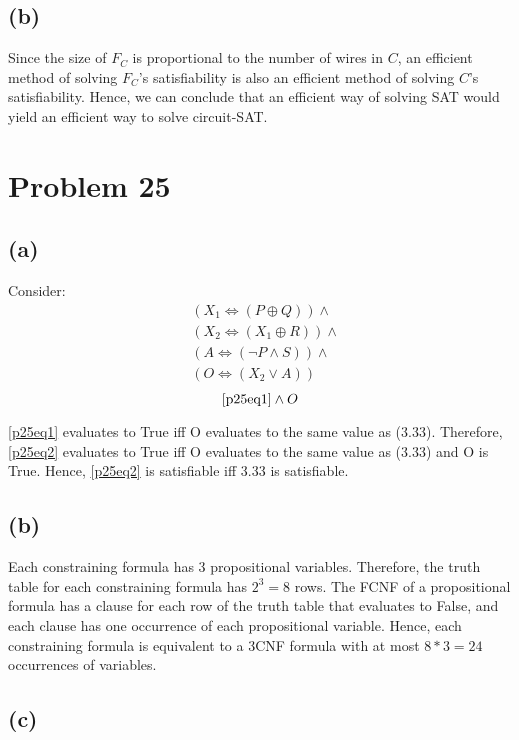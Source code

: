 \documentclass{article}
\begin{document}
\subsection{(b)}
Since the size of $F_C$ is proportional to the number of wires in $C$, an efficient method of solving $F_C$'s satisfiability is also an efficient method of solving $C$'s satisfiability. Hence, we can conclude that an efficient way of solving SAT would yield an efficient way to solve circuit-SAT.

\pagebreak

\section{Problem 25}
\subsection{(a)}
Consider:
\begin{align*}
	 & (X_1 \iff (P \oplus Q)) \land   \\
	 & (X_2 \iff (X_1 \oplus R)) \land \\
	 & (A \iff (\neg P \land S)) \land \\
	 & (O \iff (X_2 \lor A))
	\tag{\theequation}\label{p25eq1}
\end{align*}
\begin{equation}\label{p25eq2}
	\eqref{p25eq1} \land O
\end{equation}

\eqref{p25eq1} evaluates to True iff O evaluates to the same value as (3.33).  Therefore, \eqref{p25eq2} evaluates to True iff O evaluates to the same value as (3.33) and O is True. Hence, \eqref{p25eq2} is satisfiable iff 3.33 is satisfiable.

\subsection{(b)}
Each constraining formula has 3 propositional variables. Therefore, the truth table for each constraining formula has $2^3 = 8$ rows.  The FCNF of a propositional formula has a clause for each row of the truth table that evaluates to False, and each clause has one occurrence of each propositional variable. Hence, each constraining formula is equivalent to a 3CNF formula with at most $8 * 3 = 24$ occurrences of variables.

\subsection{(c)}
\end{document}

